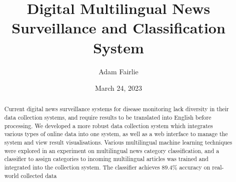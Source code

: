 \documentclass{l4proj}
\begin{document}
\title{Digital Multilingual News Surveillance and Classification System}
\author{Adam Fairlie}
\date{March 24, 2023}

\maketitle

\begin{abstract}
    Current digital news surveillance systems for disease monitoring lack diversity in their data collection systems, and require results to be translated into English before processing. We developed a more robust data collection system which integrates various types of online data into one system, as well as a web interface to manage the system and view result visualisations. Various multilingual machine learning techniques were explored in an experiment on multilingual news category classification, and a classifier to assign categories to incoming multilingual articles was trained and integrated into the collection system. The classifier achieves 89.4\% accuracy on real-world collected data
\end{abstract}


%
%
\def\consentname {Adam Fairlie} %
\def\consentdate {24 March 2023} %
%
\educationalconsent


\tableofcontents
\end{document}
